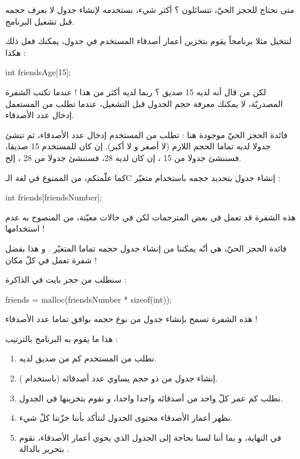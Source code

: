 متى نحتاج للحجز الحيّ، تتسائلون ؟ أكثر شيء، نستخدمه لإنشاء جدول لا نعرف حجمه قبل تشغيل البرنامج.

لنتخيل مثلا برنامجاً يقوم بتخزين أعمار أصدقاء المستخدم في جدول، يمكنك فعل ذلك هكذا :

\begin{Csource}
int friendsAge[15];
\end{Csource}

لكن من قال أنه لديه 15 صديق ؟ ربما لديه أكثر من هذا !
عندما تكتب الشفرة المصدريّة، لا يمكنك معرفة حجم الجدول قبل التشغيل، عندما تطلب من المستعمل إدخال عدد الأصدقاء.

فائدة الحجز الحيّ موجودة هنا : تطلب من المستخدم إدخال عدد الأصدقاء، ثم تنشئ جدولا لديه تماما الحجم اللازم (لا أصغر و لا أكبر). إن كان للمستخدم 15 صديقا، فسننشئ جدولا من 15
،
إن كان لديه 28، فسننشئ جدولا من 28
،
إلخ.

كما علّمتكم، من الممنوع في لغة الـ\textenglish{C}
إنشاء جدول بتحديد حجمه باستخدام متغيّر :

\begin{Csource}
int friends[friendsNumber];
\end{Csource}

\begin{information}
هذه الشفرة قد تعمل في بعض المترجمات لكن في حالات معيّنة، من المنصوح به عدم استخدامها !
\end{information}

فائدة الحجز الحيّ، هي أنّه يمكننا من إنشاء جدول حجمه تماما المتغيّر
.
و هذا بفضل شفرة تعمل في كلّ مكان !

سنطلب من
حجز
بايت في الذاكرة :

\begin{Csource}
friends = malloc(friendsNumber * sizeof(int));
\end{Csource}

هذه الشفرة تسمح بإنشاء جدول من نوع
حجمه بوافق تماما عدد الأصدقاء !

هذا ما يقوم به البرنامج بالترتيب :
\begin{enumerate}
  \item نطلب من المستخدم كم من صديق لديه.
  \item إنشاء جدول من
ذو حجم يساوي عدد أصدقائه (باستخدام
).
  \item نطلب كم عمر كلّ واحد من أصدقائه واحدا واحدا، و نقوم بتخزينها في الجدول.
  \item نظهر أعمار الأصدقاء محتوى الجدول لنتأكد بأننا خزّننا كلّ شيء.
  \item في النهاية، و بما أننا لسنا بحاجة إلى الجدول الذي يحوي أعمار الأصدقاء، نقوم بتحرير بالدالة
.
\end{enumerate}

